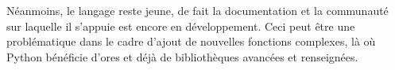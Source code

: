 \documentclass[a4paper]{report}
\begin{document}
Néanmoins, le langage reste jeune, de fait la documentation et la communauté sur laquelle il s'appuie est encore en développement. Ceci peut être une problématique dans le cadre d'ajout de nouvelles fonctions complexes, là où Python bénéficie d'ores et déjà de bibliothèques avancées et renseignées.\\ 




    
\end{document}
